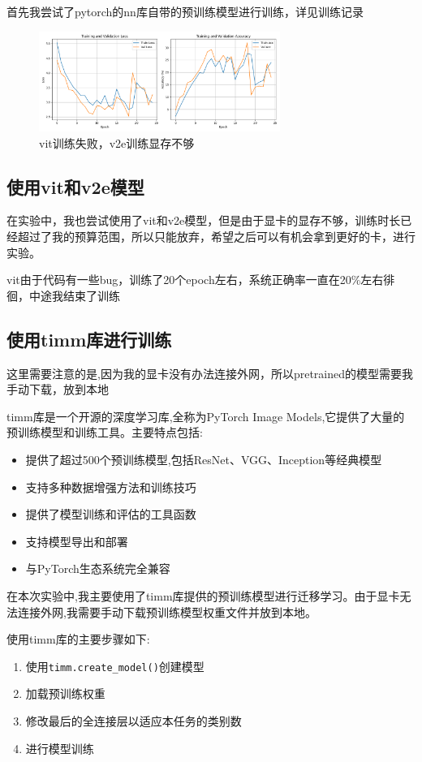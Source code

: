 \documentclass[12pt,a4paper,UTF8]{article}
\begin{document}
首先我尝试了pytorch的nn库自带的预训练模型进行训练，详见训练记录

\begin{figure}[htbp] \centering \includegraphics[width=0.7\textwidth]{figures/2024-12-12-19-29-03.png} \caption{vit训练失败，v2e训练显存不够} \end{figure}


\subsection{使用vit和v2e模型}
在实验中，我也尝试使用了vit和v2e模型，但是由于显卡的显存不够，训练时长已经超过了我的预算范围，所以只能放弃，希望之后可以有机会拿到更好的卡，进行实验。

vit由于代码有一些bug，训练了20个epoch左右，系统正确率一直在20\%左右徘徊，中途我结束了训练

\subsection{使用timm库进行训练}

这里需要注意的是,因为我的显卡没有办法连接外网，所以pretrained的模型需要我手动下载，放到本地


timm库是一个开源的深度学习库,全称为PyTorch Image Models,它提供了大量的预训练模型和训练工具。主要特点包括:

\begin{itemize}
    \item 提供了超过500个预训练模型,包括ResNet、VGG、Inception等经典模型
    \item 支持多种数据增强方法和训练技巧
    \item 提供了模型训练和评估的工具函数
    \item 支持模型导出和部署
    \item 与PyTorch生态系统完全兼容
\end{itemize}

在本次实验中,我主要使用了timm库提供的预训练模型进行迁移学习。由于显卡无法连接外网,我需要手动下载预训练模型权重文件并放到本地。

使用timm库的主要步骤如下:
\begin{enumerate}
    \item 使用\texttt{timm.create\_model()}创建模型
    \item 加载预训练权重
    \item 修改最后的全连接层以适应本任务的类别数
    \item 进行模型训练
\end{enumerate}
\end{document}
